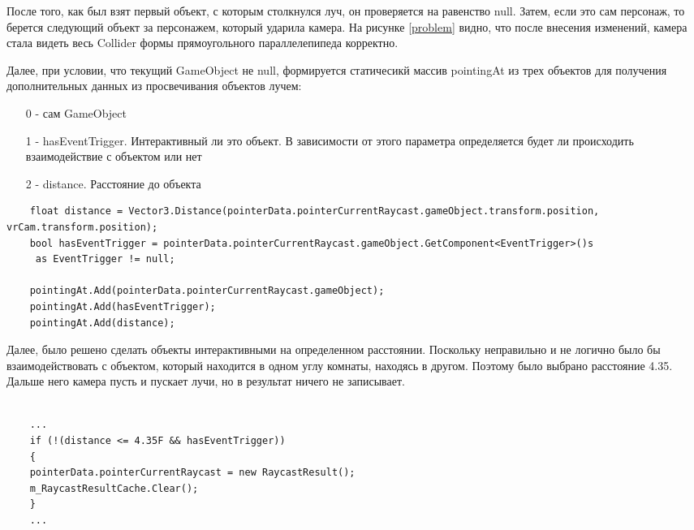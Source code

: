 После того, как был взят первый объект, с которым столкнулся луч, он проверяется на равенство null. Затем, если это сам персонаж, то берется следующий объект за персонажем, который ударила камера. На рисунке \ref{problem} видно, что после внесения изменений, камера стала видеть весь Collider формы прямоугольного параллелепипеда корректно. 

Далее, при условии, что текущий GameObject не null, формируется статичесикй массив pointingAt из трех объектов для получения дополнительных данных из просвечивания объектов лучем:
\begin{itemize}
    \item [0] - сам GameObject
    \item [1] - hasEventTrigger. Интерактивный ли это объект. В зависимости от этого параметра определяется будет ли происходить взаимодействие с объектом или нет
    \item [2] - distance. Расстояние до объекта
\end{itemize}

\begin{small}
    \begin{verbatim}
    float distance = Vector3.Distance(pointerData.pointerCurrentRaycast.gameObject.transform.position, vrCam.transform.position);
    bool hasEventTrigger = pointerData.pointerCurrentRaycast.gameObject.GetComponent<EventTrigger>()s
     as EventTrigger != null;
    
    pointingAt.Add(pointerData.pointerCurrentRaycast.gameObject);
    pointingAt.Add(hasEventTrigger);
    pointingAt.Add(distance);
    \end{verbatim}
\end{small}

Далее, было решено сделать объекты интерактивными на определенном расстоянии. Поскольку неправильно и не логично было бы взаимодействовать с объектом, который находится в одном углу комнаты, находясь в другом. Поэтому было выбрано расстояние 4.35. Дальше него камера пусть и пускает лучи, но в результат ничего не записывает. 

\begin{small}
    \begin{verbatim}
    
    ...
    if (!(distance <= 4.35F && hasEventTrigger))
    {
    pointerData.pointerCurrentRaycast = new RaycastResult();
    m_RaycastResultCache.Clear();
    }
    ...
    \end{verbatim}
\end{small}


